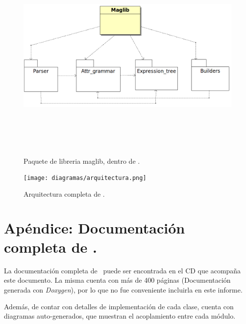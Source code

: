 \begin{figure}[!ht]\centering
\includegraphics[width=635pt, height=300pt, angle=90]{diagramas/maggen.png}
\caption{\label{fig:dia-maglib}Paquete de libreria maglib, dentro de \maggen.}
\end{figure}

\begin{figure}[!ht]\centering
\texttt{[image: diagramas/arquitectura.png]}
\caption{\label{fig:arquitec-full}Arquitectura completa de \maggen.}
\end{figure}



\chapter{Apéndice: Documentación completa de \maggen.}
\label{chap:appendix-doxy}
La documentación completa de \maggen\ puede ser encontrada en el CD que acompaña este documento. La misma cuenta con más de 400 páginas (Documentación generada con \textit{Doxygen}), por lo que no fue conveniente incluirla en este informe. 

Además, de contar con detalles de implementación de cada clase, cuenta con diagramas auto-generados, que muestran el acoplamiento entre cada módulo.

